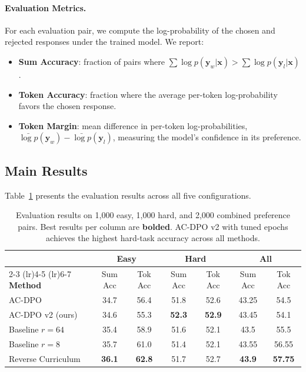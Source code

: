 \documentclass{article}
\begin{document}
\paragraph{Evaluation Metrics.}
For each evaluation pair, we compute the log-probability of the chosen and rejected responses under the trained model. We report:
\begin{itemize}
    \item \textbf{Sum Accuracy}: fraction of pairs where $\sum \log p(\mathbf{y}_w | \mathbf{x}) > \sum \log p(\mathbf{y}_l | \mathbf{x})$.
    \item \textbf{Token Accuracy}: fraction where the average per-token log-probability favors the chosen response.
    \item \textbf{Token Margin}: mean difference in per-token log-probabilities, $\bar{\log p}(\mathbf{y}_w) - \bar{\log p}(\mathbf{y}_l)$, measuring the model's confidence in its preference.
\end{itemize}

\subsection{Main Results}

Table~\ref{tab:main_results} presents the evaluation results across all five configurations.

\begin{table}[t]
\caption{Evaluation results on 1,000 easy, 1,000 hard, and 2,000 combined preference pairs. Best results per column are \textbf{bolded}. AC-DPO v2 with tuned epochs achieves the highest hard-task accuracy across all methods.}
\label{tab:main_results}
\centering
\small
\begin{tabular}{l cc cc cc}
\toprule
& \multicolumn{2}{c}{\textbf{Easy}} & \multicolumn{2}{c}{\textbf{Hard}} & \multicolumn{2}{c}{\textbf{All}} \\
\cmidrule(lr){2-3} \cmidrule(lr){4-5} \cmidrule(lr){6-7}
\textbf{Method} & Sum Acc & Tok Acc & Sum Acc & Tok Acc & Sum Acc & Tok Acc \\
\midrule
AC-DPO             & 34.7 & 56.4 & 51.8 & 52.6 & 43.25 & 54.5 \\
AC-DPO v2 (ours)   & 34.6 & 55.3 & \textbf{52.3} & \textbf{52.9} & 43.45 & 54.1 \\
Baseline $r{=}64$  & 35.4 & 58.9 & 51.6 & 52.1 & 43.5  & 55.5 \\
Baseline $r{=}8$   & 35.7 & 61.0 & 51.4 & 52.1 & 43.55 & 56.55 \\
Reverse Curriculum  & \textbf{36.1} & \textbf{62.8} & 51.7 & 52.7 & \textbf{43.9} & \textbf{57.75} \\
\bottomrule
\end{tabular}
\end{table}
\end{document}
